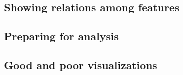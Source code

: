



\subsection{Showing relations among features}
\subsection{Preparing for analysis}
\subsection{Good and poor visualizations}

